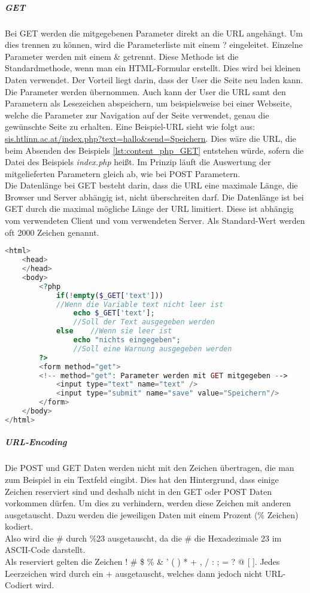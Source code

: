 \subparagraph{GET\\}
Bei GET werden die mitgegebenen Parameter direkt an die URL angehängt. Um dies trennen zu können, wird die Parameterliste mit einem ? eingeleitet. Einzelne Parameter werden mit einem \& getrennt. Diese Methode ist die Standardmethode, wenn man ein HTML-Formular erstellt. Dies wird bei kleinen Daten verwendet. Der Vorteil liegt darin, dass der User die Seite neu laden kann. Die Parameter werden übernommen. Auch kann der User die URL samt den Parametern als Lesezeichen abspeichern, um beispielsweise bei einer Webseite, welche die Parameter zur Navigation auf der Seite verwendet, genau die gewünschte Seite zu erhalten. Eine Beispiel-URL sieht wie folgt aus: \url{sis.htlinn.ac.at/index.php?text=hallo\&send=Speichern}. Dies wäre die URL, die beim Absenden des Beispiels \ref{lst:content_php_GET} entstehen würde, sofern die Datei des Beispiels \textit{index.php} heißt. Im Prinzip läuft die Auswertung der mitgelieferten Parametern gleich ab, wie bei POST Parametern.\\
Die Datenlänge bei GET besteht darin, dass die URL eine maximale Länge, die Browser und Server abhängig ist, nicht überschreiten darf.
Die Datenlänge ist bei GET durch die maximal mögliche Länge der URL limitiert. Diese ist abhängig vom verwendeten Client und vom verwendeten Server. Als Standard-Wert werden oft 2000 Zeichen genannt.
\begin{lstlisting}[style=custom, language=PHP,  caption={Beispiel GET},label={lst:content_php_GET}]
<html>
	<head>
	</head>
	<body>
		<?php
			if(!empty($_GET['text']))	
			//Wenn die Variable text nicht leer ist
				echo $_GET['text'];	
				//Soll der Text ausgegeben werden
			else	//Wenn sie leer ist
				echo "nichts eingegeben";	
				//Soll eine Warnung ausgegeben werden
		?>
		<form method="get">	
		<!-- method="get": Parameter werden mit GET mitgegeben -->
			<input type="text" name="text" />
			<input type="submit" name="save" value="Speichern"/>
		</form>
	</body>
</html>
\end{lstlisting}
\subparagraph{URL-Encoding\\}
Die POST und GET Daten werden nicht mit den Zeichen übertragen, die man zum Beispiel in ein Textfeld eingibt. Dies hat den Hintergrund, dass einige Zeichen reserviert sind und deshalb nicht in den GET oder POST Daten vorkommen dürfen. Um dies zu verhindern, werden diese Zeichen mit anderen ausgetauscht. Dazu werden die jeweiligen Daten mit einem Prozent (\% Zeichen) kodiert.\\
Also wird die \# durch \%23 ausgetauscht, da die \# die Hexadezimale 23 im ASCII-Code darstellt.\\
Als reserviert gelten die Zeichen ! \# \$ \% \& ' ( ) * + , / : ; = ? @ [ ]. Jedes Leerzeichen wird durch ein + ausgetauscht, welches dann jedoch nicht URL-Codiert wird.
